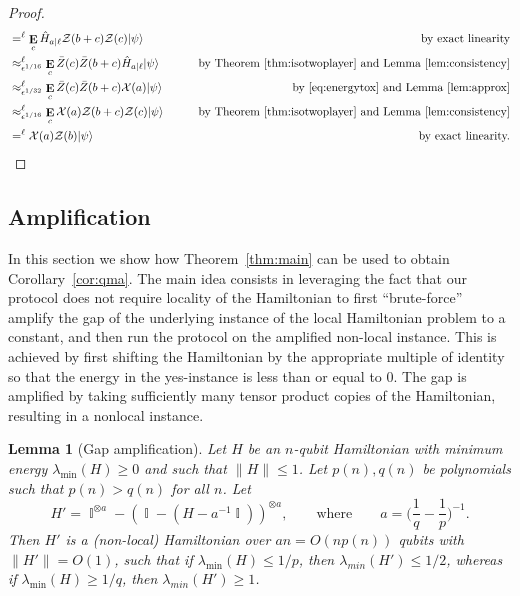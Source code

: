 \documentclass[11pt,letterpaper]{article}
\newcommand{\<}{\langle}
\renewcommand{\>}{\rangle}
\newtheorem{lemma}[theorem]{Lemma}
\newcommand{\thmref}[1]{Theorem~\ref{thm:#1}}
\newcommand{\lemref}[1]{Lemma~\ref{lem:#1}}
\newcommand{\myeqref}[1]{\eqref{eq:#1}}
\newcommand{\ket}[1]{| #1 \>}
\newcommand{\eps}{\epsilon}
\newcommand{\Xlin}{\mathcal{X}}
\newcommand{\Zlin}{\mathcal{Z}}
\DeclareMathOperator{\E}{\mathbf{E}}
\DeclareMathOperator{\Id}{\mathbb{I}}
\newcommand{\app}[2]{\approx_{#1}^{#2}}
\renewcommand{\sp}{\hat{H}}
\newcommand{\cz}{\bar{Z}}
\begin{document}
\begin{proof}
\begin{alignat*}{2}
    &=^{\ell}\E_c \sp_{a|\ell} \Zlin(b + c) \Zlin(c) \ket{\psi} \qquad &\text{by exact linearity} \\
    &\app{\eps^{1/16}}{\ell} \E_c \cz(c) \cz(b+c) \sp_{a|\ell} \ket{\psi} \qquad &\text{by \thmref{isotwoplayer} and \lemref{consistency}}\\
    &\app{\eps^{1/32}}{\ell} \E_c \cz(c)\cz(b+c) \Xlin(a) \ket{\psi} \qquad &\text{by \myeqref{energytox} and \lemref{approx}}\\
    &\app{\eps^{1/16}}{\ell} \E_c \Xlin(a) \Zlin(b+c)\Zlin(c) \ket{\psi} \qquad &\text{by \thmref{isotwoplayer} and \lemref{consistency}}\\
    &=^{\ell} \Xlin(a) \Zlin(b) \ket{\psi} \qquad &\text{by exact linearity.}
  \end{alignat*}
\end{proof}


\subsection{Amplification}
\label{sec:amplification}

In this section we show how Theorem~\ref{thm:main} can be used to
obtain Corollary~\ref{cor:qma}. The main idea consists in leveraging the fact that our protocol does not require locality of the Hamiltonian to first ``brute-force'' amplify the
gap of the underlying instance of the local Hamiltonian problem to a constant, and then run the protocol on the amplified non-local instance. This is achieved
 by first shifting the Hamiltonian by the appropriate multiple of
identity so that the energy in the yes-instance is less than or equal
to $0$. The gap is amplified by taking sufficiently many tensor product copies of the Hamiltonian, resulting in a nonlocal instance.

\begin{lemma}[Gap amplification]
Let $H$ be an $n$-qubit Hamiltonian with
minimum energy $\lambda_{\min}(H)\geq 0$ and such that $\|H\|\leq 1$. 
  Let $p(n), q(n)$ be polynomials such that $p(n) >
  q(n)$ for all $n$. Let 
	$$H' =  \Id^{\otimes a} - (\Id - ( H - a^{-1}\Id))^{\otimes a},\qquad \text{where}\qquad a = \Big(\frac{1}{q}-\frac{1}{p}\Big)^{-1}.$$
	Then $H'$ is a (non-local) Hamiltonian over $an = O(np(n))$
        qubits with $\|H'\|=O(1)$, such that if $\lambda_{\min}(H) \leq 1/p$, then $\lambda_{min}(H') \leq 1/2$, whereas if $\lambda_{\min}(H) \geq 1/q$, then $\lambda_{min}(H') \geq 1$.
  \label{lem:amplify}
\end{lemma}
\end{document}
